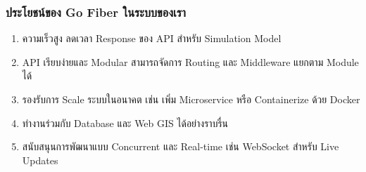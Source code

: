 \subsubsection{ประโยชน์ของ Go Fiber ในระบบของเรา}
\begin{enumerate}
    \item ความเร็วสูง ลดเวลา Response ของ API สำหรับ Simulation Model
    \item API เรียบง่ายและ Modular สามารถจัดการ Routing และ Middleware แยกตาม Module ได้
    \item รองรับการ Scale ระบบในอนาคต เช่น เพิ่ม Microservice หรือ Containerize ด้วย Docker
    \item ทำงานร่วมกับ Database และ Web GIS ได้อย่างราบรื่น
    \item สนับสนุนการพัฒนาแบบ Concurrent และ Real-time เช่น WebSocket สำหรับ Live Updates
\end{enumerate}




